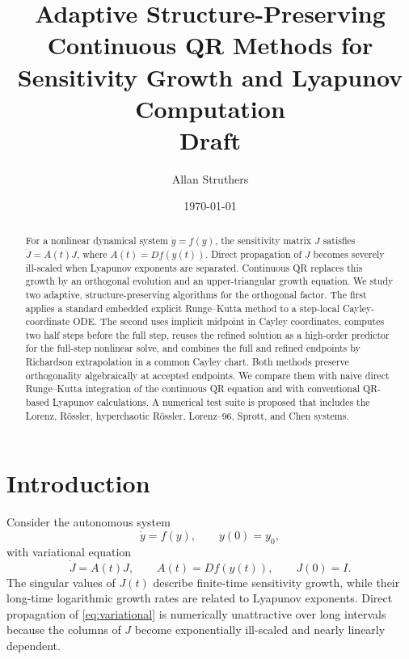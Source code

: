 \documentclass[11pt]{article}
\title{Adaptive Structure-Preserving Continuous QR Methods for Sensitivity Growth and Lyapunov Computation\\\large Draft}
\author{Allan Struthers}
\date{\today}
\begin{document}
\maketitle

\begin{abstract}
For a nonlinear dynamical system $\dot y=f(y)$, the sensitivity matrix $J$ satisfies $\dot J=A(t)J$, where $A(t)=Df(y(t))$. Direct propagation of $J$ becomes severely ill-scaled when Lyapunov exponents are separated. Continuous QR replaces this growth by an orthogonal evolution and an upper-triangular growth equation. We study two adaptive, structure-preserving algorithms for the orthogonal factor. The first applies a standard embedded explicit Runge--Kutta method to a step-local Cayley-coordinate ODE. The second uses implicit midpoint in Cayley coordinates, computes two half steps before the full step, reuses the refined solution as a high-order predictor for the full-step nonlinear solve, and combines the full and refined endpoints by Richardson extrapolation in a common Cayley chart. Both methods preserve orthogonality algebraically at accepted endpoints. We compare them with naive direct Runge--Kutta integration of the continuous QR equation and with conventional QR-based Lyapunov calculations. A numerical test suite is proposed that includes the Lorenz, R\"ossler, hyperchaotic R\"ossler, Lorenz--96, Sprott, and Chen systems.
\end{abstract}

\section{Introduction}
Consider the autonomous system
\begin{equation}
 \dot y=f(y), \qquad y(0)=y_0,
 \label{eq:state}
\end{equation}
with variational equation
\begin{equation}
 \dot J=A(t)J,\qquad A(t)=Df(y(t)),\qquad J(0)=I.
 \label{eq:variational}
\end{equation}
The singular values of $J(t)$ describe finite-time sensitivity growth, while their long-time logarithmic growth rates are related to Lyapunov exponents. Direct propagation of \eqref{eq:variational} is numerically unattractive over long intervals because the columns of $J$ become exponentially ill-scaled and nearly linearly dependent.
\end{document}
